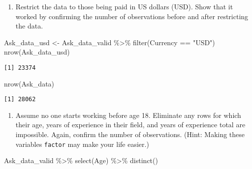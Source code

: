 \documentclass[
  letterpaper,
  DIV=11,
  numbers=noendperiod]{scrartcl}
\newenvironment{Shaded}{\begin{snugshade}}{\end{snugshade}}
\newcommand{\FunctionTok}[1]{\textcolor[rgb]{0.28,0.35,0.67}{#1}}
\newcommand{\NormalTok}[1]{\textcolor[rgb]{0.00,0.23,0.31}{#1}}
\newcommand{\OtherTok}[1]{\textcolor[rgb]{0.00,0.23,0.31}{#1}}
\newcommand{\SpecialCharTok}[1]{\textcolor[rgb]{0.37,0.37,0.37}{#1}}
\newcommand{\StringTok}[1]{\textcolor[rgb]{0.13,0.47,0.30}{#1}}
\providecommand{\tightlist}{%
  \setlength{\itemsep}{0pt}\setlength{\parskip}{0pt}}\usepackage{longtable,booktabs,array}
\begin{document}
\begin{enumerate}
\def\labelenumi{\alph{enumi}.}
\setcounter{enumi}{2}
\tightlist
\item
  Restrict the data to those being paid in US dollars (USD). Show that
  it worked by confirming the number of observations before and after
  restricting the data.
\end{enumerate}

\begin{Shaded}
\begin{Highlighting}[]
\NormalTok{Ask\_data\_usd }\OtherTok{\textless{}{-}}\NormalTok{ Ask\_data\_valid }\SpecialCharTok{\%\textgreater{}\%} \FunctionTok{filter}\NormalTok{(Currency }\SpecialCharTok{==} \StringTok{"USD"}\NormalTok{)}
\FunctionTok{nrow}\NormalTok{(Ask\_data\_usd)}
\end{Highlighting}
\end{Shaded}

\begin{verbatim}
[1] 23374
\end{verbatim}

\begin{Shaded}
\begin{Highlighting}[]
\FunctionTok{nrow}\NormalTok{(Ask\_data)}
\end{Highlighting}
\end{Shaded}

\begin{verbatim}
[1] 28062
\end{verbatim}

\begin{enumerate}
\def\labelenumi{\alph{enumi}.}
\setcounter{enumi}{3}
\tightlist
\item
  Assume no one starts working before age 18. Eliminate any rows for
  which their age, years of experience in their field, and years of
  experience total are impossible. Again, confirm the number of
  observations. (Hint: Making these variables \texttt{factor} may make
  your life easier.)
\end{enumerate}

\begin{Shaded}
\begin{Highlighting}[]
\NormalTok{Ask\_data\_valid }\SpecialCharTok{\%\textgreater{}\%} \FunctionTok{select}\NormalTok{(Age) }\SpecialCharTok{\%\textgreater{}\%} \FunctionTok{distinct}\NormalTok{()}
\end{Highlighting}
\end{Shaded}
\end{document}

